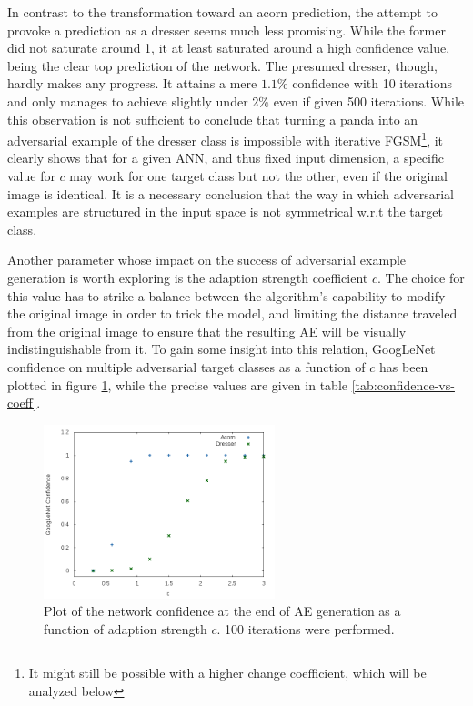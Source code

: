 \documentclass[11pt, a4paper]{article}
\begin{document}
In contrast to the transformation toward an acorn prediction, the attempt to provoke a prediction as a dresser seems much less promising. While the former did not saturate around 1, it at least saturated around a high confidence value, being the clear top prediction of the network. The presumed dresser, though, hardly makes any progress. It attains a mere $1.1\%$ confidence with 10 iterations and only manages to achieve slightly under $2\%$ even if given 500 iterations. While this observation is not sufficient to conclude that turning a panda into an adversarial example of the dresser class is impossible with iterative FGSM\footnote{It might still be possible with a higher change coefficient, which will be analyzed below}, it clearly shows that for a given ANN, and thus fixed input dimension, a specific value for $c$ may work for one target class but not the other, even if the original image is identical. It is a necessary conclusion that the way in which adversarial examples are structured in the input space is not symmetrical w.r.t the target class.

Another parameter whose impact on the success of adversarial example generation is worth exploring is the adaption strength coefficient $c$. The choice for this value has to strike a balance between the algorithm's capability to modify the original image in order to trick the model, and limiting the distance traveled from the original image to ensure that the resulting AE will be visually indistinguishable from it. To gain some insight into this relation, GoogLeNet confidence on multiple adversarial target classes as a function of $c$ has been plotted in figure \ref{fig:confidence-vs-coeff}, while the precise values are given in table \ref{tab:confidence-vs-coeff}.

\begin{figure}[h!tb]
	\centering
	\includegraphics[width=0.6\textwidth]{images/confidence-vs-coeff.png}
	\caption{Plot of the network confidence at the end of AE generation as a function of adaption strength $c$. 100 iterations were performed.}
	\label{fig:confidence-vs-coeff}
\end{figure}
\end{document}
